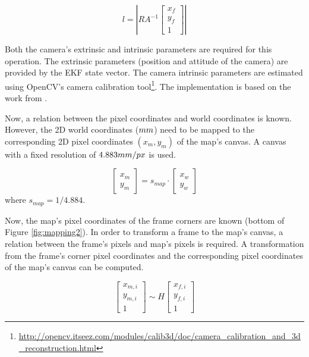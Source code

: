\begin{equation}
l = 
\left|
R
A^{-1}
\left[ {
\begin{array}{c} x_f \\ y_f \\ 1 \end{array}
} \right]
\right|
\end{equation}

Both the camera's extrinsic and intrinsic parameters are required for this operation.
The extrinsic parameters (position and attitude of the camera) are provided by the EKF state vector.
The camera intrinsic parameters are estimated using OpenCV's camera calibration tool\footnote{\url{http://opencv.itseez.com/modules/calib3d/doc/camera_calibration_and_3d_reconstruction.html}}. The implementation is based on the work from \cite{Zhang2000, Bouguet1999}.


Now, a relation between the pixel coordinates and world coordinates is known.
However, the 2D world coordinates ($\small{mm}$) need to be mapped to the corresponding 2D pixel coordinates $(x_m, y_m)$ of the map's canvas.
A canvas with a fixed resolution of $4.883\small{mm/px}$ is used.

\begin{equation}
\left[ {
\begin{array}{c} x_{m} \\ y_{m} \end{array}
} \right]
= s_{map} \cdot
\left[ {
\begin{array}{c} x_{w} \\ y_{w} \end{array}
} \right]
\end{equation}
where $s_{map} = 1 / 4.884$.

Now, the map's pixel coordinates of the frame corners are known (bottom of Figure \ref{fig:mapping2}).
In order to transform a frame to the map's canvas, a relation between the frame's pixels and map's pixels is required.
A transformation from the frame's corner pixel coordinates and the corresponding pixel coordinates of the map's canvas can be computed.

\begin{equation}
\left[ {
\begin{array}{c} x_{m,i} \\ y_{m,i} \\ 1 \end{array}
} \right]
\sim
H
\left[ {
\begin{array}{c} x_{f,i} \\ y_{f,i} \\ 1 \end{array}
} \right]
\end{equation}

